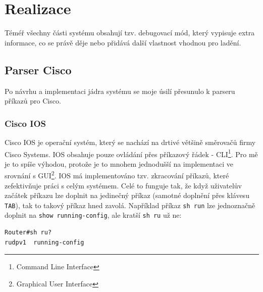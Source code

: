 \chapter{Realizace} \label{realizace}


Téméř všechny části systému obsahují tzv. debugovací mód, který vypisuje extra informace, co se právě děje nebo přidává další vlastnost vhodnou pro ladění.

\section{Parser Cisco}
Po návrhu a implementaci jádra systému se moje úsilí přesunulo k parseru příkazů pro Cisco. 

\subsection{Cisco IOS}
Cisco IOS je operační systém, který se nachází na drtivé většině směrovačů firmy Cisco Systems. IOS obsahuje pouze ovládání přes příkazový řádek - CLI\footnote{Command Line Interface}. Pro mě je to spíše výhodou, protože je to mnohem jednodušší na implementaci ve srovnání s  GUI\footnote{Graphical User Interface}. IOS má implementováno tzv. zkracování příkazů, které zefektivňuje práci s celým systémem. Celé to funguje tak, že když uživatelův začátek příkazu lze doplnit na jedinečný příkaz (samotné doplnění přes klávesu \verb|TAB|), tak to takový příkaz hned zavolá. Například příkaz \verb|sh run| lze jednoznačně doplnit na \verb|show running-config|, ale kratší \verb|sh ru| už ne:
\begin{verbatim}
Router#sh ru?
rudpv1  running-config
\end{verbatim} 

